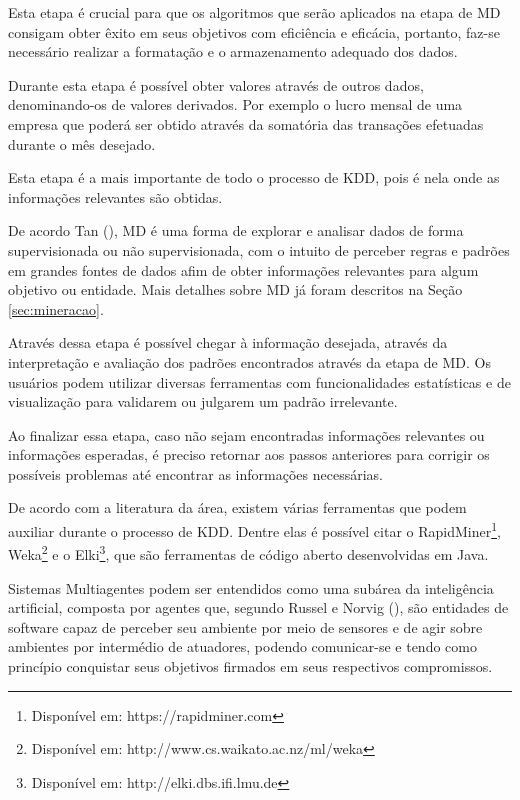 
Esta etapa é crucial para que os algoritmos que serão aplicados na etapa de MD consigam obter êxito em seus objetivos com eficiência e eficácia, portanto, faz-se necessário realizar a formatação e o armazenamento adequado dos dados.

Durante esta etapa é possível obter valores através de outros dados, denominando-os de valores derivados. Por exemplo o lucro mensal de uma empresa que poderá ser obtido através da somatória das transações efetuadas durante o mês desejado.


Esta etapa é a mais importante de todo o processo de KDD, pois é nela onde as informações relevantes são obtidas.

De acordo Tan (\citeyear{tan2006introduction}), MD é uma forma de explorar e analisar dados de forma supervisionada ou não supervisionada, com o intuito de perceber regras e padrões em grandes fontes de dados afim de obter informações relevantes para algum objetivo ou entidade. Mais detalhes sobre MD já foram descritos na Seção \ref{sec:mineracao}.


Através dessa etapa é possível chegar à informação desejada, através da interpretação e avaliação dos padrões encontrados através da etapa de MD. Os usuários podem utilizar diversas ferramentas com funcionalidades estatísticas e de visualização para validarem ou julgarem um padrão irrelevante.

Ao finalizar essa etapa, caso não sejam encontradas informações relevantes ou informações esperadas, é preciso retornar aos passos anteriores para corrigir os possíveis problemas até encontrar as informações necessárias.

De acordo com a literatura da área, existem várias ferramentas que podem auxiliar durante o processo de KDD. Dentre elas é possível citar o RapidMiner\footnote{Disponível em: https://rapidminer.com}, Weka\footnote{Disponível em: http://www.cs.waikato.ac.nz/ml/weka} e o Elki\footnote{Disponível em: http://elki.dbs.ifi.lmu.de}, que são ferramentas de código aberto desenvolvidas em Java.

\label{sec:multiagentes}

Sistemas Multiagentes podem ser entendidos como uma subárea da inteligência artificial, composta por agentes que, segundo Russel e Norvig (\citeyear{russel2004inteligencia}), são entidades de software capaz de perceber seu ambiente por meio de sensores e de agir sobre ambientes por intermédio de atuadores, podendo comunicar-se e tendo como princípio conquistar seus objetivos firmados em seus respectivos compromissos.

